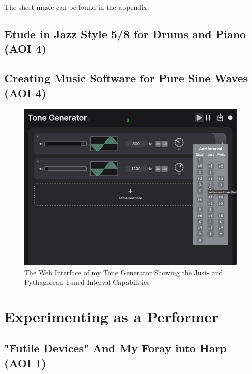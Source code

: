 \documentclass[12pt]{article}
\begin{document}
The sheet music can be found in the appendix.

\subsection{Etude in Jazz Style 5/8 for Drums and Piano (AOI 4)}

\subsection{Creating Music Software for Pure Sine Waves (AOI 4)}

\begin{figure}[H]
\centering
\includegraphics[width=0.85\linewidth]{tone gen ui}
\caption{The Web Interface of my Tone Generator Showing the Just- and Pythagorean-Tuned Interval Capabilities}
\label{fig:ui}
\end{figure}



\section{Experimenting as a Performer}

\subsection{"Futile Devices" And My Foray into  Harp (AOI 1)}
\end{document}
